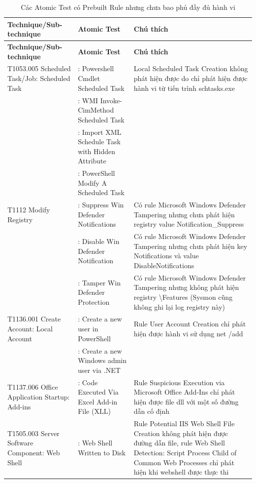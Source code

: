 \begingroup
\small
\renewcommand{\arraystretch}{1.12}
\setlength{\LTpre}{0pt}
\setlength{\LTpost}{0pt}
\begin{longtable}{|>{\raggedright\arraybackslash}p{3.2cm}|>{\raggedright\arraybackslash}p{5.5cm}|>{\raggedright\arraybackslash}p{5.8cm}|}
\caption{Các Atomic Test có Prebuilt Rule nhưng chưa bao phủ đầy đủ hành vi}\label{tab:rule-chua-hoan-thien}\\
\hline
\textbf{Technique/Sub-technique} & \textbf{Atomic Test} & \textbf{Chú thích} \\
\hline
\endfirsthead
\hline
\textbf{Technique/Sub-technique} & \textbf{Atomic Test} & \textbf{Chú thích} \\
\hline
\endhead
\hline
\endfoot
\hline
\endlastfoot
T1053.005 Scheduled Task/Job: Scheduled Task & 4: Powershell Cmdlet Scheduled Task & Local Scheduled Task Creation không phát hiện được do chỉ phát hiện được hành vi từ tiến trình schtasks.exe \\*
\cline{2-2}
 & 6: WMI Invoke-CimMethod Scheduled Task &  \\*
\cline{2-2}
 & 8: Import XML Schedule Task with Hidden Attribute &  \\*
\cline{2-2}
 & 9: PowerShell Modify A Scheduled Task &  \\
\hline
T1112 Modify Registry & 38: Suppress Win Defender Notifications & Có rule Microsoft Windows Defender Tampering nhưng chưa phát hiện registry value Notification\_Suppress \\*
\cline{2-3}
 & 51: Disable Win Defender Notification & Có rule Microsoft Windows Defender Tampering nhưng chưa phát hiện key Notifications và value DisableNotifications \\*
\cline{2-3}
 & 56: Tamper Win Defender Protection & Có rule Microsoft Windows Defender Tampering nhưng không phát hiện registry \textbackslash{}Features (Sysmon cũng không ghi lại log registry này) \\
\hline
T1136.001 Create Account: Local Account & 5: Create a new user in PowerShell & Rule User Account Creation chỉ phát hiện được hành vi sử dụng net /add \\*
\cline{2-2}
 & 9: Create a new Windows admin user via .NET &  \\
\hline
T1137.006 Office Application Startup: Add-ins & 1: Code Executed Via Excel Add-in File (XLL) & Rule Suspicious Execution via Microsoft Office Add-Ins chỉ phát hiện được file dll với một số đường dẫn cố định \\
\hline
T1505.003 Server Software Component: Web Shell & 1: Web Shell Written to Disk & Rule Potential IIS Web Shell File Creation không phát hiện được đường dẫn file, rule Web Shell Detection: Script Process Child of Common Web Processes chỉ phát hiện khi webshell được thực thi \\

\end{longtable}
